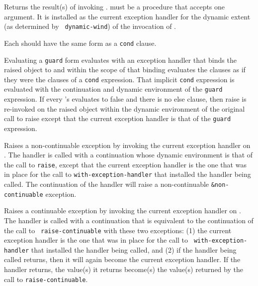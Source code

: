 \begin{entry}{%
}

Returns the result(s) of invoking .  must be a
procedure that accepts one argument. It is installed as the current
exception handler for the dynamic extent (as determined by {\tt
  dynamic-wind}) of the invocation of .
\end{entry}

\begin{entry}{%
}

\syntax
Each  should have the same form as a {\tt cond} clause.

\semantics 
Evaluating a {\tt guard} form evaluates  with an exception
handler that binds the raised object to  and within the scope of
that binding evaluates the clauses as if they were the clauses of a
{\tt cond} expression. That implicit {\tt cond} expression is evaluated with the
continuation and dynamic environment of the {\tt guard} expression. If every
's  evaluates to false and there is no else clause, then
raise is re-invoked on the raised object within the dynamic
environment of the original call to raise except that the current
exception handler is that of the {\tt guard} expression.  
\end{entry}

\begin{entry}{%
}

Raises a non-continuable exception by invoking the current exception
handler on . The handler is called with a continuation whose
dynamic environment is that of the call to {\tt raise}, except that
the current exception handler is the one that was in place for the
call to {\tt with-exception-handler} that installed the handler being
called.  The continuation of the handler will raise a non-continuable
{\tt \&non-continuable} exception.
\end{entry}

\begin{entry}{%
}

Raises a continuable exception by invoking the current exception
handler on . The handler is called with a continuation that
is equivalent to the continuation of the call to {\tt
  raise-continuable} with these two exceptions: (1) the current
exception handler is the one that was in place for the call to {\tt
  with-exception-handler} that installed the handler being called, and
(2) if the handler being called returns, then it will again become the
current exception handler.  If the handler returns, the value(s) it
returns become(s) the value(s) returned by the call to
{\tt raise-continuable}.
\end{entry}

